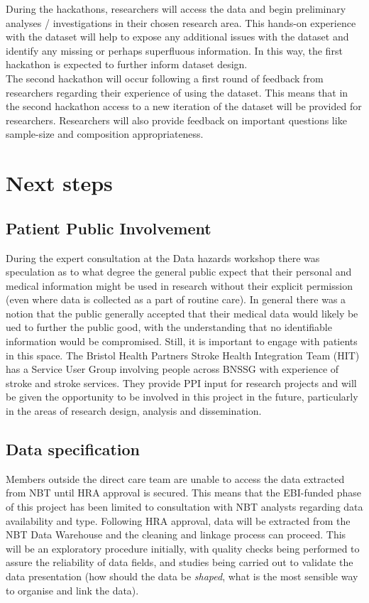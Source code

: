 \documentclass{article}
\begin{document}
During the hackathons, researchers will access the data and begin
preliminary analyses / investigations in their chosen research
area. This hands-on experience with the dataset will help to expose
any additional issues with the dataset and identify any missing or
perhaps superfluous information. In this way, the first hackathon is
expected to further inform dataset design. \\

The second hackathon will occur following a first round of feedback
from researchers regarding their experience of using the dataset. This
means that in the second hackathon access to a new iteration of the
dataset will be provided for researchers. Researchers will also
provide feedback on important questions like sample-size and
composition appropriateness. 

\section{Next steps}


\subsection{Patient Public Involvement}


During the expert consultation at the Data hazards workshop there was speculation as to what degree the general public expect that
their personal and medical information might be used in research
without their explicit permission (even where data is collected as a
part of routine care).
In general there was a notion that the public generally accepted that
their medical data would likely be ued to further the public good,
with the understanding that no identifiable information would be
compromised. Still, it is important to engage with patients in this
space. The Bristol Health Partners Stroke Health Integration Team
(HIT) has a Service User Group involving people across BNSSG with
experience of stroke and stroke services.
They provide PPI input for research projects and will be given the
opportunity to be involved in this project in the future,
particularly in the areas of research design, analysis and
dissemination.

\subsection{Data specification}

Members outside the direct care team are unable to access the data
extracted from NBT until HRA approval is secured. This means that the
EBI-funded phase of this project has been limited to consultation with
NBT analysts regarding data availability and type. Following HRA
approval, data will be extracted from the NBT Data Warehouse and the
cleaning and linkage process can proceed. This will be an exploratory
procedure initially, with quality checks being performed to assure the
reliability of data fields, and studies being carried out to validate
the data presentation (how should the data be \textit{shaped}, what is
the most sensible way to organise and link the data).\\
\end{document}
